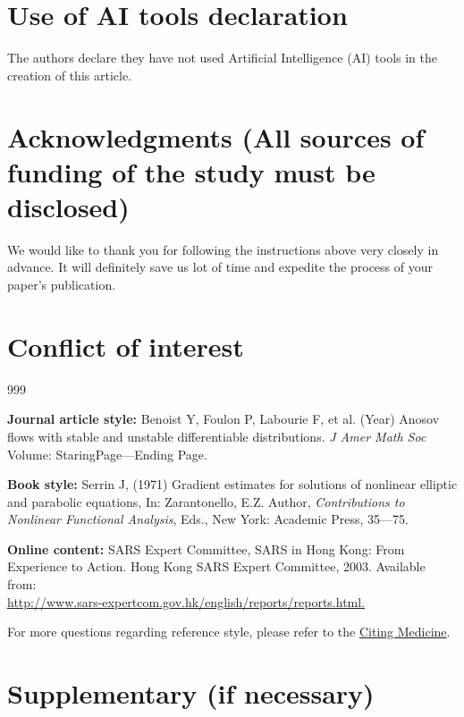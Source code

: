 \documentclass{aims}
\numberwithin{equation}{section}
\begin{document}



\section*{Use of AI tools declaration}
The authors declare they have not used Artificial Intelligence (AI) tools in the creation of this article.

\section*{Acknowledgments (All sources of funding of the study must be disclosed)}
We would like to thank you for following the instructions above 
very closely in advance. It will definitely save us lot of 
time and expedite the process of your paper's publication.

\section*{Conflict of interest}

\begin{thebibliography}{999}

     \newblock  \textbf{Journal article style:} Benoist Y, Foulon P, Labourie F, et al. (Year) Anosov flows with stable and unstable differentiable distributions.
     \newblock \emph{ J Amer Math Soc}
     \newblock  Volume: StaringPage{--\hspace*{-2mm}--}Ending Page.


    \newblock \textbf{Book style:}
    \newblock Serrin J, (1971) Gradient estimates for solutions of nonlinear elliptic and parabolic equations, In: Zarantonello, E.Z. Author,
    \newblock \emph{Contributions to Nonlinear Functional Analysis},
     Eds., New York: Academic Press, 35{--\hspace*{-2mm}--}75.


    \newblock \textbf{Online content:}
    \newblock  SARS Expert Committee, SARS in Hong Kong: From Experience to Action. Hong Kong SARS Expert Committee, 2003. Available from: \\ \url{http://www.sars-expertcom.gov.hk/english/reports/reports.html.} 

\end{thebibliography}


For more questions regarding reference style, please refer to the \href{http://www.ncbi.nlm.nih.gov/books/NBK7256/}{Citing Medicine}.

\section*{Supplementary (if necessary)}
\end{document}
